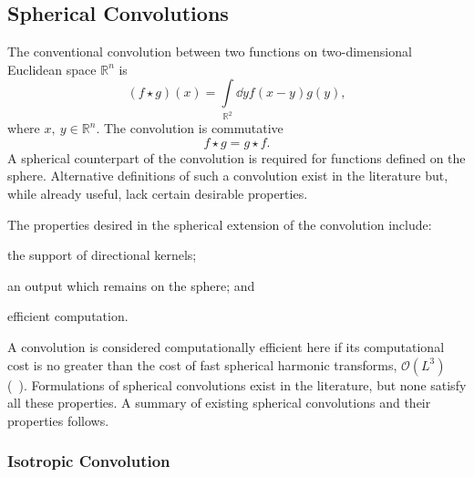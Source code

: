 \subsection{Spherical Convolutions}\label{sec:chapter2_spherical_convolutions}

The conventional convolution between two functions on two-dimensional Euclidean space \(\mathbb{R}^{n}\) is
%
\begin{equation}
	(f \star g)(x)
	= \int\limits_{\mathbb{R}^{2}} \dd{y} f(x-y) g(y),
\end{equation}
%
where \(x,\ y \in \mathbb{R}^{n}\).
The convolution is commutative
%
\begin{equation}
	f \star g
	= g \star f.
\end{equation}
%
A spherical counterpart of the convolution is required for functions defined on the sphere.
Alternative definitions of such a convolution exist in the literature but, while already useful, lack certain desirable properties.

The properties desired in the spherical extension of the convolution include:
%
\begin{inparaenum}[(i)]
	\item the support of directional kernels;
	\item an output which remains on the sphere; and
	\item efficient computation.
\end{inparaenum}
%
A convolution is considered computationally efficient here if its computational cost is no greater than the cost of fast spherical harmonic transforms, \ie{} \(\mathcal{O}(L^{3})\) (\eg{}~\cite{Driscoll1994,McEwen2011}).
Formulations of spherical convolutions exist in the literature, but none satisfy all these properties.
A summary of existing spherical convolutions and their properties follows.

\subsubsection{Isotropic Convolution}

